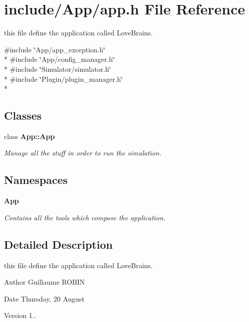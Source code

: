 \section{include/\+App/app.h File Reference}
\label{app_8h}


this file define the application called Love\+Brains.  


{\ttfamily \#include \char`\"{}App/app\+\_\+exception.\+h\char`\"{}}\\*
{\ttfamily \#include \char`\"{}App/config\+\_\+manager.\+h\char`\"{}}\\*
{\ttfamily \#include \char`\"{}Simulator/simulator.\+h\char`\"{}}\\*
{\ttfamily \#include \char`\"{}Plugin/plugin\+\_\+manager.\+h\char`\"{}}\\*
\subsection*{Classes}
\begin{DoxyCompactItemize}
\item 
class {\bf App\+::\+App}
\begin{DoxyCompactList}\small\item\em Manage all the stuff in order to run the simulation. \end{DoxyCompactList}\end{DoxyCompactItemize}
\subsection*{Namespaces}
\begin{DoxyCompactItemize}
\item 
 {\bf App}
\begin{DoxyCompactList}\small\item\em Contains all the tools which compose the application. \end{DoxyCompactList}\end{DoxyCompactItemize}


\subsection{Detailed Description}
this file define the application called Love\+Brains. 

\begin{DoxyAuthor}{Author}
Guillaume R\+O\+B\+I\+N 
\end{DoxyAuthor}
\begin{DoxyDate}{Date}
Thursday, 20 August 
\end{DoxyDate}
\begin{DoxyVersion}{Version}
1.. 
\end{DoxyVersion}
